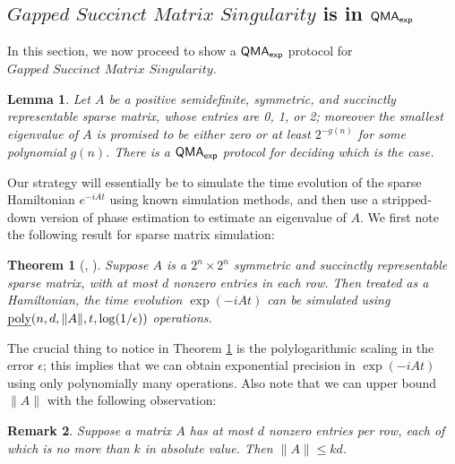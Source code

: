 \documentclass[11pt]{article}
\newtheorem{theorem}{Theorem}
\newtheorem{lemma}{Lemma}
\newtheorem{remark}[theorem]{Remark}
\theoremstyle{definition}
\theoremstyle{remark}
\newcommand\QMAexp{{\sf{QMA}_{exp}}}
\newcommand\gappedsucc{\textit{Gapped Succinct Matrix Singularity}}
\begin{document}
\subsection{$\gappedsucc$ is in $\QMAexp$}
In this section, we now proceed to show a $\QMAexp$ protocol for $\gappedsucc$.
\begin{lemma} \label{lem:qmaexp protocol}
Let $A$ be a positive semidefinite, symmetric, and succinctly representable sparse matrix, whose entries are 0, 1, or 2; moreover the smallest eigenvalue of $A$ is promised to be either zero or at least $2^{-g(n)}$ for some polynomial $g(n)$. There is a $\QMAexp$ protocol for deciding which is the case.
\end{lemma}
Our strategy will essentially be to simulate the time evolution of the sparse Hamiltonian $e^{-iAt}$ using known simulation methods, and then use a stripped-down version of phase estimation to estimate an eigenvalue of $A$. We first note the following result for sparse matrix simulation:
\begin{theorem}[\cite{berry14}, \cite{berry15}] \label{thm:ham_sim}
Suppose $A$ is a $2^n \times 2^n$ symmetric and succinctly representable sparse matrix, with at most $d$ nonzero entries in each row. Then treated as a Hamiltonian, the time evolution $\exp(-iAt)$ can be simulated using $\text{\emph{poly}}(n,d,\|A\|, t, \log(1/\epsilon))$ operations.
\end{theorem}
The crucial thing to notice in Theorem \ref{thm:ham_sim} is the polylogarithmic scaling in the error $\epsilon$; this implies that we can obtain exponential precision in $\exp(-iAt)$ using only polynomially many operations. Also note that we can upper bound $\|A\|$ with the following observation:
\begin{remark}
Suppose a matrix $A$ has at most $d$ nonzero entries per row, each of which is no more than $k$ in absolute value. Then $\| A \| \le kd$.
\end{remark}
\end{document}
